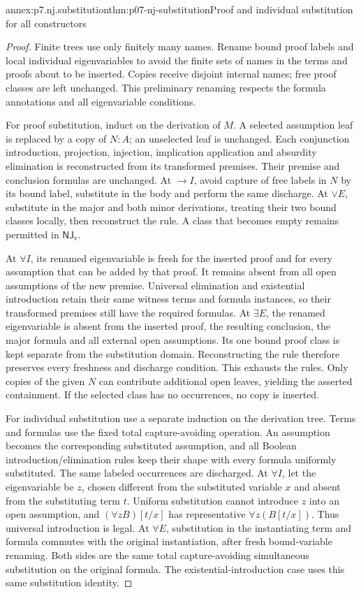 \begin{annexitem}{annex:p7.nj.substitution}{thm:p07-nj-substitution}{Proof and individual substitution for all constructors}
\begin{proof}
Finite trees use only finitely many names. Rename bound proof
labels and local individual eigenvariables to avoid the finite
sets of names in the terms and proofs about to be inserted.
Copies receive disjoint internal names; free proof classes are
left unchanged. This preliminary renaming respects the formula
annotations and all eigenvariable conditions.

For proof substitution, induct on the derivation of \(M\).
A selected assumption leaf is replaced by a copy of \(N:A\);
an unselected leaf is unchanged. Each conjunction introduction,
projection, injection, implication application and absurdity
elimination is reconstructed from its transformed premises.
Their premise and conclusion formulas are unchanged. At
\(\to I\), avoid capture of free labels in \(N\) by its
bound label, substitute in the body and perform the same
discharge. At \(\lor E\), substitute in the major and both
minor derivations, treating their two bound classes locally,
then reconstruct the rule. A class that becomes empty remains
permitted in \(\mathsf{NJ}_{\mathrm v}\).

At \(\forall I\), its renamed eigenvariable is fresh for
the inserted proof and for every assumption that can be added
by that proof. It remains absent from all open assumptions of
the new premise. Universal elimination and existential
introduction retain their same witness terms and formula
instances, so their transformed premises still have the
required formulas. At \(\exists E\), the renamed eigenvariable
is absent from the inserted proof, the resulting conclusion,
the major formula and all external open assumptions. Its
one bound proof class is kept separate from the substitution
domain. Reconstructing the rule therefore preserves every
freshness and discharge condition. This exhausts the rules.
Only copies of the given \(N\) can contribute additional
open leaves, yielding the asserted containment. If the selected
class has no occurrences, no copy is inserted.

For individual substitution use a separate induction on the
derivation tree. Terms and formulas use the fixed total
capture-avoiding operation. An assumption becomes the
corresponding substituted assumption, and all Boolean
introduction/elimination rules keep their shape with every
formula uniformly substituted. The same labeled occurrences
are discharged. At \(\forall I\), let the eigenvariable
be \(z\), chosen different from the substituted variable
\(x\) and absent from the substituting term \(t\).
Uniform substitution cannot introduce \(z\) into an open
assumption, and
\((\forall z B)[t/x]\) has representative
\(\forall z(B[t/x])\). Thus universal introduction is legal.
At \(\forall E\), substitution in the instantiating term
and formula commutes with the original instantiation, after
fresh bound-variable renaming. Both sides are the same total
capture-avoiding simultaneous substitution on the original
formula. The existential-introduction case uses this same
substitution identity.


\end{proof}
\end{annexitem}
